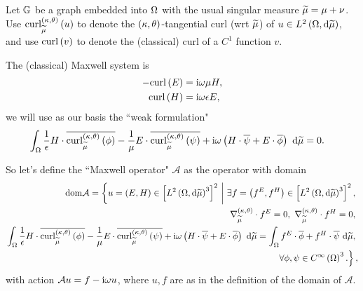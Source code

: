 \documentclass[11pt]{report}
\renewcommand{\curl}[1]{\mathrm{curl}\bracs{#1}}
\renewcommand{\ktcurl}[1]{\mathrm{curl}^{\kt}_{\dddmes}\bracs{#1}}
\newcommand{\aop}{\mathcal{A}}
\begin{document}
Let $\mathbb{G}$ be a graph embedded into $\Omega$ with the usual singular measure $\widetilde{\mu} = \mu + \nu$.
Use $\ktcurl{u}$ to denote the $\left( \kappa, \theta \right)$-tangential curl (wrt $\widetilde{\mu}$) of $u\in L^{2}\left( \Omega,\mathrm{d}\widetilde{\mu} \right)$, and use $\curl{v}$ to denote the (classical) curl of a $C^1$ function $v$.

The (classical) Maxwell system is
\begin{subequations} \label{eq:MaxwellSystem}
	\begin{align} 
		- \curl{E} &= \rmi\omega\mu H, \\
		\curl{H} &= \rmi\omega\epsilon E,
	\end{align}
\end{subequations}
we will use as our basis the ``weak formulation"
\begin{align*}
	\integral{\ddom}{ \recip{\epsilon}H\cdot\overline{\ktcurl{\phi}} - \recip{\mu}E\cdot\overline{\ktcurl{\psi}} + \rmi\omega\bracs{H\cdot\overline{\psi} + E\cdot\overline{\phi}} }{\dddmes}
	&= 0.
\end{align*}

So let's define the ``Maxwell operator" $\aop$ as the operator with domain
\begin{align*}
	\mathrm{dom}\aop = \clbracs{ u = \bracs{E,H}\in\sqbracs{\ltwo{\ddom}{\dddmes}^3}^2 \setVert \exists f=\bracs{f^E, f^H}\in\sqbracs{\ltwo{\ddom}{\dddmes}^3}^2, \right. \\
	\left. \ktgrad_{\dddmes}\cdot f^E = 0, \ \ktgrad_{\dddmes}\cdot f^H = 0, \right. \\
	\left. \integral{\ddom}{ \recip{\epsilon}H\cdot\overline{\ktcurl{\phi}} - \recip{\mu}E\cdot\overline{\ktcurl{\psi}} + \rmi\omega\bracs{H\cdot\overline{\psi} + E\cdot\overline{\phi}} }{\dddmes}
	= \integral{\ddom}{f^E\cdot\overline{\phi} + f^H\cdot\overline{\psi}}{\dddmes}, \right. \\
	\left. \forall\phi,\psi\in\smooth{\ddom}^3.  },
\end{align*}
with action $\aop u = f - \rmi\omega u$, where $u,f$ are as in the definition of the domain of $\aop$.
\end{document}
